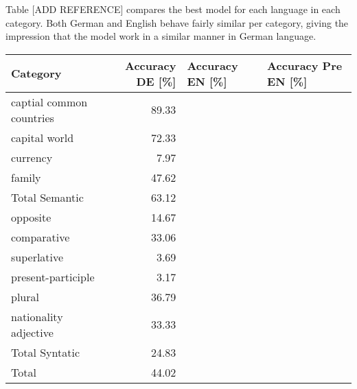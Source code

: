 


Table [ADD  REFERENCE] compares the best model for each language in each
category. Both German and English behave fairly similar per category, giving
the impression that the model work in a similar manner in German language. 



\small
\begin{center}
\begin{tabular}{lrll}
 Category                  &  Accuracy DE [\%]  &  Accuracy EN [\%]  &
 Accuracy Pre EN [\%]  \\
\hline
 captial common countries  &             89.33  &                    &                     \\
 capital world             &             72.33  &                    &                     \\
 currency                  &              7.97  &                    &                     \\
 family                    &             47.62  &                    &                     \\
\hline
 Total Semantic            &             63.12  &                    &                     \\
\hline
 opposite                  &             14.67  &                    &                     \\
 comparative               &             33.06  &                    &                     \\
 superlative               &              3.69  &                    &                     \\
 present-participle        &              3.17  &                    &                     \\
 plural                    &             36.79  &                    &                     \\
 nationality adjective     &             33.33  &                    &                     \\
\hline
 Total Syntatic            &             24.83  &                    &                     \\
\hline
 Total                     &             44.02  &                    &                     \\
\end{tabular}
\end{center}











